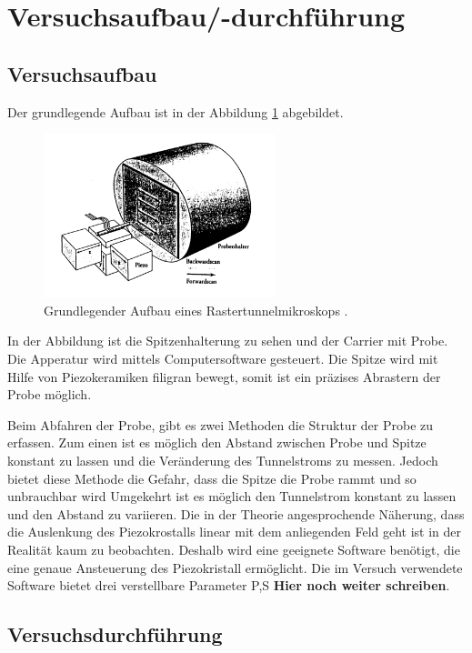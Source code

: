 \section{Versuchsaufbau/-durchführung}

\subsection{Versuchsaufbau}
Der grundlegende Aufbau ist in der Abbildung \ref{fig: aufbau} abgebildet.
\begin{figure}[h]
  \centering
  \includegraphics[width=0.6\textwidth]{./pics/aufbau.png}
  \caption{Grundlegender Aufbau eines Rastertunnelmikroskops \cite{rtm}.}
  \label{fig: aufbau}
\end{figure}
In der Abbildung ist die Spitzenhalterung zu sehen und
der Carrier mit Probe. Die Apperatur wird mittels Computersoftware gesteuert.
Die Spitze wird mit Hilfe von Piezokeramiken filigran bewegt, somit
ist ein präzises Abrastern der Probe möglich.

Beim Abfahren der Probe, gibt es zwei Methoden die Struktur der Probe zu erfassen.
Zum einen ist es möglich den Abstand zwischen Probe und Spitze konstant zu lassen
und die Veränderung des Tunnelstroms zu messen.
Jedoch bietet diese Methode die Gefahr, dass die Spitze die Probe rammt und so unbrauchbar wird
Umgekehrt ist es möglich den Tunnelstrom konstant zu lassen und den Abstand zu variieren.
Die in der Theorie angesprochende Näherung, dass die Auslenkung des Piezokrostalls linear
mit dem anliegenden Feld geht ist in der Realität kaum zu beobachten. Deshalb wird eine
geeignete Software benötigt, die eine genaue Ansteuerung des Piezokristall ermöglicht.
Die im Versuch verwendete Software bietet drei verstellbare Parameter P,S \textbf{Hier noch weiter schreiben}.


\subsection{Versuchsdurchführung}


